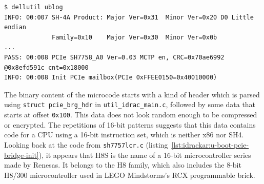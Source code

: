 \begin{lstlisting}[language={},caption={Extract from command \texttt{dellutil ublog}.},label={lst:idrackar:dellutil-ublog}]
$ dellutil ublog
INFO: 00:007 SH-4A Product: Major Ver=0x31  Minor Ver=0x20 D0 Little endian
             Family=0x10    Major Ver=0x30  Minor Ver=0x0b
...
PASS: 00:008 PCIe SH7758_A0 Ver=0.03 MCTP en, CRC=0x70ae6992 @0x8efd591c cnt=0x18000
INFO: 00:008 Init PCIe mailbox(PCIe 0xFFEE0150=0x40010000)
\end{lstlisting}

The binary content of the microcode starts with a kind of header which is parsed using \texttt{struct pcie\_brg\_hdr} in \texttt{util\_idrac\_main.c}, followed by some data that starts at offset \texttt{0x100}.
This data does not look random enough to be compressed or encrypted.
The repetitions of 16-bit patterns suggests that this data contains code for a CPU using a 16-bit instruction set, which is neither x86 nor SH4.
Looking back at the code from \texttt{sh7757lcr.c} (listing~\ref{lst:idrackar:u-boot-pcie-bridge-init}), it appears that H8S is the name of a 16-bit microcontroller series made by Renesas.
It belongs to the H8 family, which also includes the 8-bit H8/300 microcontroller used in LEGO Mindstorms's RCX programmable brick.


